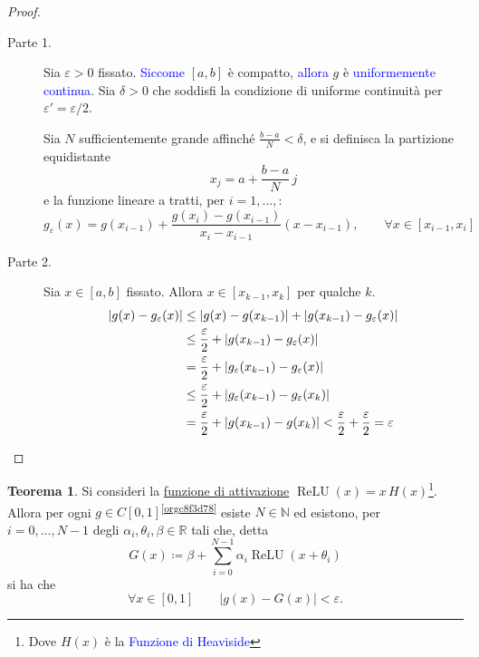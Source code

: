 \documentclass[10pt]{book}
\newcommand{\1}{\mathds{1}}
\newcommand{\R}{\mathds{R}}
\newcommand{\N}{\mathds{N}}
\theoremstyle{definition}%
\newtheorem{thm}{Teorema}[section]
\theoremstyle{plain}
\theoremstyle{remark}
\renewcommand{\href}[2]{\textcolor{blue}{#2}}
\begin{document}
\begin{proof}
\hphantom{Ciano}\par

\begin{description}
\item[{Parte 1.}] Sia \(\varepsilon>0\) fissato. \href{../../../../../org/roam/20250701121640-teorema_di_heine_borel.org}{Siccome} \([a,b]\) è compatto, \href{../../../../../org/roam/20250630155208-funzione_reale_continua_su_un_compatto_e_uniformemente_continua.org}{allora} \(g\) è \href{../../../../../org/roam/20250611135127-funzione_uniformemente_continua.org}{uniformemente continua}. Sia \(\delta>0\) che soddisfi la condizione di uniforme continuità per \(\varepsilon'=\varepsilon/2\).

Sia \(N\) sufficientemente grande affinché \(\frac{b-a}{N}<\delta\), e si definisca la partizione equidistante
\begin{equation*}
  x_{j} = a + \frac{b-a}{N}\, j
\end{equation*}
e la funzione lineare a tratti, per \(i=1,\dots,\):
\begin{equation*}
  g_{\varepsilon}(x) = g(x_{i-1}) +\frac{g(x_{i})-g(x_{i-1})}{x_{i}-x_{i-1}} (x-x_{i-1}),\qquad \forall x \in [x_{i-1},x_{i}]
\end{equation*}

\item[{Parte 2.}] Sia \(x \in [a,b]\) fissato. Allora \(x \in [x_{k-1},x_{k}]\) per qualche \(k\).
\begin{align*}
  |g(x)-g_{\varepsilon}(x)| &\le |g(x)-g(x_{k-1})| + |g(x_{k-1}) - g_{\varepsilon} (x)|\\
  &\le \frac{\varepsilon}{2} + |g(x_{k-1}) - g_{\varepsilon} (x)|\\
  &= \frac{\varepsilon}{2} + |g_{\varepsilon}(x_{k-1}) - g_{\varepsilon} (x)|\\
  &\le \frac{\varepsilon}{2}+ |g_{\varepsilon}(x_{k-1}) - g_{\varepsilon} (x_{k})|\\
  &= \frac{\varepsilon}{2}+ |g(x_{k-1}) - g (x_{k})| < \frac{\varepsilon}{2}+\frac{\varepsilon}{2} = \varepsilon\qedhere
\end{align*}
\end{description}
\end{proof}
\begin{thm}
Si consideri la \hyperref[sec:orgeed12bd]{funzione di attivazione} \(\operatorname{ReLU}(x) = x\,H(x)\)\footnote{Dove \(H(x)\) è la \href{../../../../../org/roam/20250624161413-funzione_di_heaviside.org}{Funzione di Heaviside}}. Allora per ogni \(g \in C[0,1]\)\textsuperscript{\ref{orgc8f3d78}} esiste \(N \in \N\) ed esistono, per \(i=0,\dots,N-1\) degli \(\alpha_{i}, \theta_{i}, \beta \in \R\) tali che, detta
\begin{equation*}
G(x) \coloneqq \beta+\sum_{i=0}^{N-1} \alpha_{i}\operatorname{ReLU}(x+\theta_{i})
\end{equation*}
si ha che
\begin{equation*}
\forall x \in[0,1]\qquad |g(x)-G(x)|<\varepsilon.
\end{equation*}
\end{thm}
\end{document}
